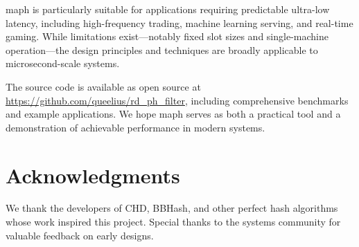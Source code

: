\documentclass[10pt,conference]{IEEEtran}
\begin{document}
maph is particularly suitable for applications requiring predictable ultra-low latency, including high-frequency trading, machine learning serving, and real-time gaming. While limitations exist—notably fixed slot sizes and single-machine operation—the design principles and techniques are broadly applicable to microsecond-scale systems.

The source code is available as open source at \url{https://github.com/queelius/rd_ph_filter}, including comprehensive benchmarks and example applications. We hope maph serves as both a practical tool and a demonstration of achievable performance in modern systems.

\section*{Acknowledgments}

We thank the developers of CHD, BBHash, and other perfect hash algorithms whose work inspired this project. Special thanks to the systems community for valuable feedback on early designs.
\end{document}
